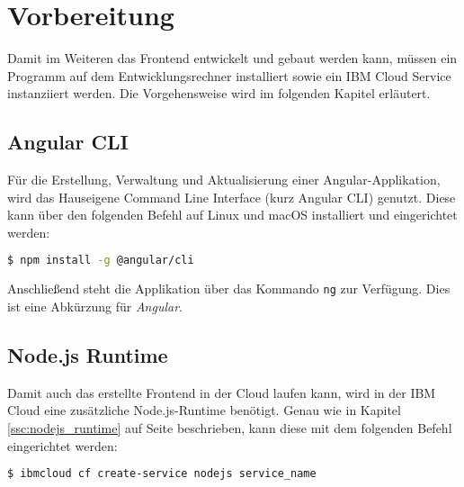 \section{Vorbereitung}
Damit im Weiteren das Frontend entwickelt und gebaut werden kann, müssen ein Programm auf dem Entwicklungsrechner
installiert sowie ein IBM Cloud Service instanziiert werden. Die Vorgehensweise wird im folgenden Kapitel erläutert.

\subsection{Angular CLI}
Für die Erstellung, Verwaltung und Aktualisierung einer Angular-Applikation, wird das Hauseigene Command Line Interface
(kurz Angular CLI) genutzt. Diese kann über den folgenden Befehl auf Linux und macOS installiert und eingerichtet werden:

\begin{lstlisting}[language=bash, caption=Installation Angular CLI, label=Installation Angular CLI]
$ npm install -g @angular/cli
\end{lstlisting}

Anschließend steht die Applikation über das Kommando \texttt{ng} zur Verfügung. Dies ist eine Abkürzung für
\textit{Angular}.

\subsection{Node.js Runtime}
Damit auch das erstellte Frontend in der Cloud laufen kann, wird in der IBM Cloud eine zusätzliche Node.js-Runtime
benötigt. Genau wie in Kapitel \ref{ssc:nodejs_runtime} auf Seite \pageref{ssc:nodejs_runtime} beschrieben, kann diese
mit dem folgenden Befehl eingerichtet werden:

\begin{lstlisting}[language=bash, caption=Instanziierung der Node.js Runtime, label=Instanziierung der Node.js Runtime]
$ ibmcloud cf create-service nodejs service_name
\end{lstlisting}
